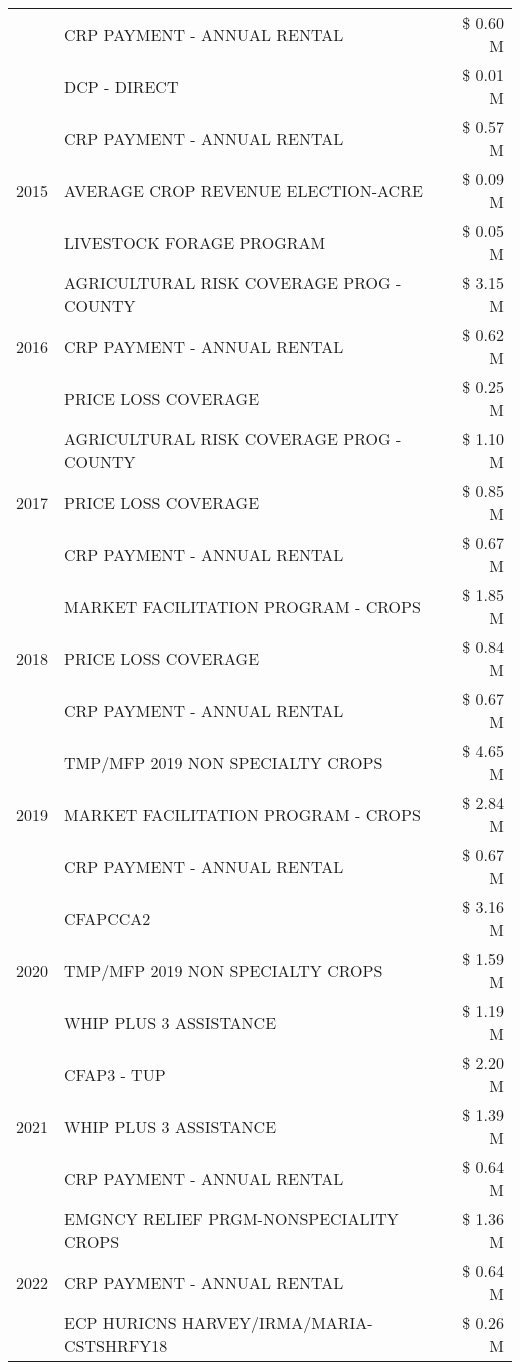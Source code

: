 \begin{tabular}{llr}
 & CRP PAYMENT - ANNUAL RENTAL & \$ 0.60 M \\
 & DCP - DIRECT & \$ 0.01 M \\
\cline{1-3}
\multirow[t]{3}{*}{2015} & CRP PAYMENT - ANNUAL RENTAL & \$ 0.57 M \\
 & AVERAGE CROP REVENUE ELECTION-ACRE & \$ 0.09 M \\
 & LIVESTOCK FORAGE PROGRAM & \$ 0.05 M \\
\cline{1-3}
\multirow[t]{3}{*}{2016} & AGRICULTURAL RISK COVERAGE PROG - COUNTY & \$ 3.15 M \\
 & CRP PAYMENT - ANNUAL RENTAL & \$ 0.62 M \\
 & PRICE LOSS COVERAGE & \$ 0.25 M \\
\cline{1-3}
\multirow[t]{3}{*}{2017} & AGRICULTURAL RISK COVERAGE PROG - COUNTY & \$ 1.10 M \\
 & PRICE LOSS COVERAGE & \$ 0.85 M \\
 & CRP PAYMENT - ANNUAL RENTAL & \$ 0.67 M \\
\cline{1-3}
\multirow[t]{3}{*}{2018} & MARKET FACILITATION PROGRAM - CROPS & \$ 1.85 M \\
 & PRICE LOSS COVERAGE & \$ 0.84 M \\
 & CRP PAYMENT - ANNUAL RENTAL & \$ 0.67 M \\
\cline{1-3}
\multirow[t]{3}{*}{2019} & TMP/MFP 2019 NON SPECIALTY CROPS & \$ 4.65 M \\
 & MARKET FACILITATION PROGRAM - CROPS & \$ 2.84 M \\
 & CRP PAYMENT - ANNUAL RENTAL & \$ 0.67 M \\
\cline{1-3}
\multirow[t]{3}{*}{2020} & CFAPCCA2 & \$ 3.16 M \\
 & TMP/MFP 2019 NON SPECIALTY CROPS & \$ 1.59 M \\
 & WHIP PLUS 3 ASSISTANCE & \$ 1.19 M \\
\cline{1-3}
\multirow[t]{3}{*}{2021} & CFAP3 - TUP & \$ 2.20 M \\
 & WHIP PLUS 3 ASSISTANCE & \$ 1.39 M \\
 & CRP PAYMENT - ANNUAL RENTAL & \$ 0.64 M \\
\cline{1-3}
\multirow[t]{3}{*}{2022} & EMGNCY RELIEF PRGM-NONSPECIALITY CROPS & \$ 1.36 M \\
 & CRP PAYMENT - ANNUAL RENTAL & \$ 0.64 M \\
 & ECP HURICNS HARVEY/IRMA/MARIA-CSTSHRFY18 & \$ 0.26 M \\
\cline{1-3}
\bottomrule
\end{tabular}
